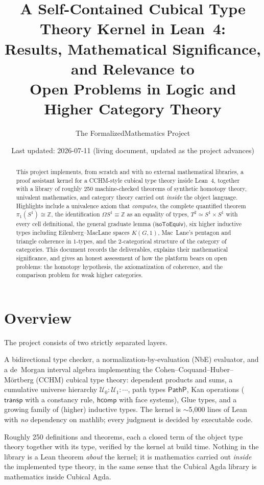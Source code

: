 \documentclass[11pt]{article}
\title{A Self-Contained Cubical Type Theory Kernel in Lean~4:\\
Results, Mathematical Significance, and Relevance to\\
Open Problems in Logic and Higher Category Theory}
\author{The FormalizedMathematics Project}
\date{Last updated: 2026-07-11 (living document, updated as the project advances)}
\newcommand{\Z}{\mathbb{Z}}
\newcommand{\U}{\mathcal{U}}
\newcommand{\op}[1]{\ensuremath{\mathsf{#1}}}
\begin{document}
\maketitle

\begin{abstract}
This project implements, from scratch and with no external mathematical
libraries, a proof assistant kernel for a CCHM-style cubical type theory
inside Lean~4, together with a library of roughly 250 machine-checked
theorems of synthetic homotopy theory, univalent mathematics, and
category theory carried out \emph{inside} the object language.  Highlights
include a univalence axiom that \emph{computes}, the complete quantified
theorem $\pi_1(S^1)\cong\Z$, the identification $\Omega S^1 \equiv \Z$ as
an equality of types, $T^2 \simeq S^1\times S^1$ with every cell
definitional, the general graduate lemma ($\op{isoToEquiv}$), six
higher inductive types including Eilenberg--MacLane spaces $K(G,1)$,
Mac~Lane's pentagon and triangle coherence in $1$-types, and the
2-categorical structure of the category of categories.  This document
records the deliverables, explains their mathematical significance, and
gives an honest assessment of how the platform bears on open problems:
the homotopy hypothesis, the axiomatization of coherence, and the
comparison problem for weak higher categories.
\end{abstract}

\tableofcontents

\section{Overview}

The project consists of two strictly separated layers.

\begin{description}[leftmargin=1.5em]
\item[The kernel (metatheory, in Lean~4).] A bidirectional type checker,
a normalization-by-evaluation (NbE) evaluator, and a de~Morgan interval
algebra implementing the Cohen--Coquand--Huber--M\"ortberg (CCHM) cubical
type theory: dependent products and sums, a cumulative universe hierarchy
$\U_0 : \U_1 : \cdots$, path types $\op{PathP}$, Kan operations
($\op{transp}$ with a constancy rule, $\op{hcomp}$ with face systems),
Glue types, and a growing family of (higher) inductive types.  The
kernel is $\sim$5{,}000 lines of Lean with \emph{no} dependency on
mathlib; every judgment is decided by executable code.
\item[The library (object language).] Roughly 250 definitions and
theorems, each a closed term of the object type theory together with its
type, verified by the kernel at build time.  Nothing in the library is a
Lean theorem \emph{about} the kernel; it is mathematics carried out
\emph{inside} the implemented type theory, in the same sense that the
Cubical Agda library is mathematics inside Cubical Agda.
\end{description}
\end{document}
